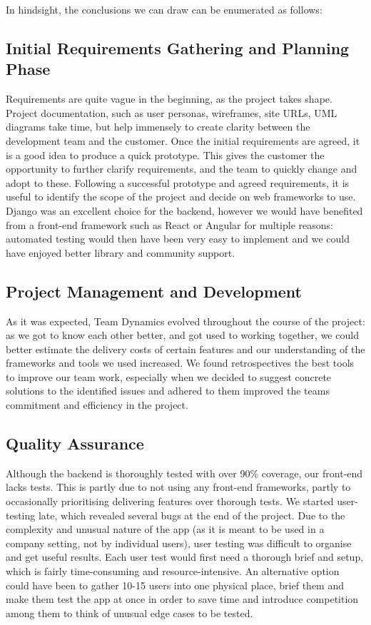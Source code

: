 \documentclass{l3proj}
\begin{document}
In hindsight, the conclusions we can draw can be enumerated as follows:

\subsection{Initial Requirements Gathering and Planning Phase}

Requirements are quite vague in the beginning, as the project takes shape. Project documentation, such as user personas, wireframes, site URLs, UML diagrams take time, but help immensely to create clarity between the development team and the customer.
Once the initial requirements are agreed, it is a good idea to produce a quick prototype. This gives the customer the opportunity to further clarify requirements, and the team to quickly change and adopt to these. Following a successful prototype and agreed requirements, it is useful to identify the scope of the project and decide on web frameworks to use. Django was an excellent choice for the backend, however we would have benefited from a front-end framework such as React or Angular for multiple reasons: automated testing would then have been very easy to implement and we could have enjoyed better library and community support.


\subsection{Project Management and Development}

As it was expected, Team Dynamics evolved throughout the course of the project: as we got to know each other better, and got used to working together, we could better estimate the delivery costs of certain features and our understanding of the frameworks and tools we used increased. We found retrospectives the best tools to improve our team work, especially when we decided to suggest concrete solutions to the identified issues and adhered to them improved the teams commitment and efficiency in the project. 


\subsection{Quality Assurance}

Although the backend is thoroughly tested with over 90\% coverage, our front-end lacks tests. This is partly due to not using any front-end frameworks, partly to occasionally prioritising delivering features over thorough tests.
We started user-testing late, which revealed several bugs at the end of the project. Due to the complexity and unusual nature of the app (as it is meant to be used in a company setting, not by individual users), user testing was difficult to organise and get useful results. Each user test would first need a thorough brief and setup, which is fairly time-consuming and resource-intensive. An alternative option could have been to gather 10-15 users into one physical place, brief them and make them test the app at once in order to save time and introduce competition among them to think of unusual edge cases to be tested.
\end{document}
